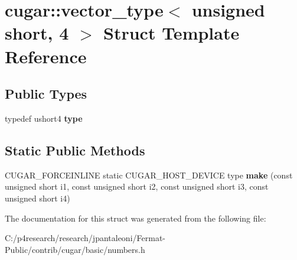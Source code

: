 \hypertarget{structcugar_1_1vector__type_3_01unsigned_01short_00_014_01_4}{}\section{cugar\+:\+:vector\+\_\+type$<$ unsigned short, 4 $>$ Struct Template Reference}
\label{structcugar_1_1vector__type_3_01unsigned_01short_00_014_01_4}
\subsection*{Public Types}
\begin{DoxyCompactItemize}
\item 
\mbox{\label{structcugar_1_1vector__type_3_01unsigned_01short_00_014_01_4_ad99b03a6cdb3cfefeaca6964286a4b50}} 
typedef ushort4 {\bfseries type}
\end{DoxyCompactItemize}
\subsection*{Static Public Methods}
\begin{DoxyCompactItemize}
\item 
\mbox{\label{structcugar_1_1vector__type_3_01unsigned_01short_00_014_01_4_ae04c4a6c62829aced83ba98694314a68}} 
C\+U\+G\+A\+R\+\_\+\+F\+O\+R\+C\+E\+I\+N\+L\+I\+NE static C\+U\+G\+A\+R\+\_\+\+H\+O\+S\+T\+\_\+\+D\+E\+V\+I\+CE type {\bfseries make} (const unsigned short i1, const unsigned short i2, const unsigned short i3, const unsigned short i4)
\end{DoxyCompactItemize}


The documentation for this struct was generated from the following file\+:\begin{DoxyCompactItemize}
\item 
C\+:/p4research/research/jpantaleoni/\+Fermat-\/\+Public/contrib/cugar/basic/numbers.\+h\end{DoxyCompactItemize}
